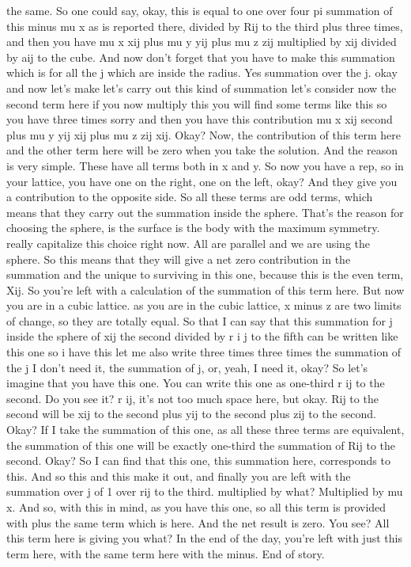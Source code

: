 the same. So one could say, okay, this is equal to one over four pi summation of this minus mu x as is reported there, divided by Rij to the third plus three times, and then you have mu x xij plus mu y yij plus mu z zij multiplied by xij divided by aij to the cube. And now don't forget that you have to make this summation which is for all the j which are inside the radius. Yes summation over the j. okay and now let's make let's carry out this kind of summation let's consider now the second term here if you now multiply this you will find some terms like this so you have three times sorry and then you have this contribution mu x xij second plus mu y yij xij plus mu z zij xij. Okay? Now, the contribution of this term here and the other term here will be zero when you take the solution. And the reason is very simple. These have all terms both in x and y. So now you have a rep, so in your lattice, you have one on the right, one on the left, okay? And they give you a contribution to the opposite side. So all these terms are odd terms, which means that they carry out the summation inside the sphere. That's the reason for choosing the sphere, is the surface is the body with the maximum symmetry. really capitalize this choice right now. All are parallel and we are using the sphere. So this means that they will give a net zero contribution in the summation and the unique to surviving in this one, because this is the even term, Xij. So you're left with a calculation of the summation of this term here. But now you are in a cubic lattice. as you are in the cubic lattice, x minus z are two limits of change, so they are totally equal. So that I can say that this summation for j inside the sphere of xij the second divided by r i j to the fifth can be written like this one so i have this let me also write three times three times the summation of the j I don't need it, the summation of j, or, yeah, I need it, okay? So let's imagine that you have this one. You can write this one as one-third r ij to the second. Do you see it? r ij, it's not too much space here, but okay. Rij to the second will be xij to the second plus yij to the second plus zij to the second. Okay? If I take the summation of this one, as all these three terms are equivalent, the summation of this one will be exactly one-third the summation of Rij to the second. Okay? So I can find that this one, this summation here, corresponds to this. And so this and this make it out, and finally you are left with the summation over j of 1 over rij to the third. multiplied by what? Multiplied by mu x. And so, with this in mind, as you have this one, so all this term is provided with plus the same term which is here. And the net result is zero. You see? All this term here is giving you what? In the end of the day, you're left with just this term here, with the same term here with the minus. End of story.
